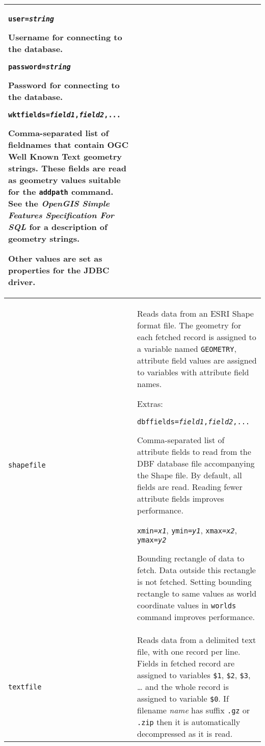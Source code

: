 \begin{longtable}{|p{3cm}|p{10cm}|}
\vspace{10pt}
\texttt{user=\textit{string}}

Username for connecting to the database.

\vspace{10pt}
\texttt{password=\textit{string}}

Password for connecting to the database.

\vspace{10pt}
\texttt{wktfields=\textit{field1},\textit{field2},...}

Comma-separated list of
fieldnames that contain OGC Well Known Text geometry strings.
These fields are read as geometry values suitable for the
\texttt{addpath} command.
See the
\textit{OpenGIS Simple Features Specification For SQL}
for a description of geometry strings.

Other values are set as properties for the JDBC driver. \\

\hline

\texttt{shapefile} &
Reads data from an ESRI Shape format file.
The geometry for each fetched record is assigned to a variable named
\texttt{GEOMETRY}, attribute field values are assigned to
variables with attribute field names.

\vspace{10pt}
Extras:

\texttt{dbffields=\textit{field1},\textit{field2},...}

Comma-separated list of
attribute fields to read from the DBF database file accompanying the
Shape file.  By default, all fields are read.  Reading fewer attribute
fields improves performance.

\vspace{10pt}
\texttt{xmin=\textit{x1}},
\texttt{ymin=\textit{y1}},
\texttt{xmax=\textit{x2}},
\texttt{ymax=\textit{y2}}

Bounding rectangle of data to fetch.  Data outside this rectangle is
not fetched.  Setting bounding rectangle to same values as world
coordinate values in \texttt{worlds} command improves performance. \\

\hline

\texttt{textfile} &
Reads data from a delimited text file, with one
record per line.  Fields in fetched record
are assigned to variables
\texttt{\$1}, \texttt{\$2}, \texttt{\$3}, \dots
and the whole record is assigned to variable
\texttt{\$0}.
If filename \textit{name} has suffix \texttt{.gz} or \texttt{.zip}
then it is automatically decompressed as it is read.


\end{longtable}
